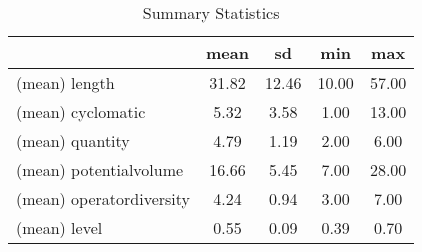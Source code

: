 \begin{table}[htbp]
\caption{\label{Table:SumStatReg} Summary Statistics}\centering\medskip
\begin{tabular}{lcccc} \hline \hline
 & mean  & sd  & min  & max  \\  \hline 
(mean) length &        31.82 &        12.46 &        10.00 &        57.00 \\  
(mean) cyclomatic &         5.32 &         3.58 &         1.00 &        13.00 \\  
(mean) quantity &         4.79 &         1.19 &         2.00 &         6.00 \\  
(mean) potentialvolume &        16.66 &         5.45 &         7.00 &        28.00 \\  
(mean) operatordiversity &         4.24 &         0.94 &         3.00 &         7.00 \\  
(mean) level &         0.55 &         0.09 &         0.39 &         0.70 \\  
\hline \hline \end{tabular}
\end{table}
